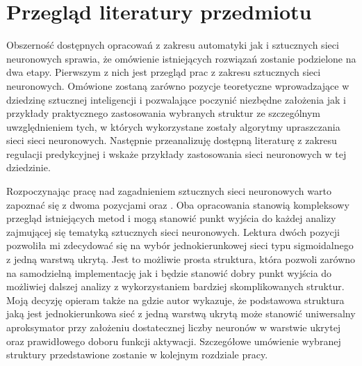 \newpage %
\section{Przegląd literatury przedmiotu}
Obszerność dostępnych opracowań z zakresu automatyki jak i sztucznych sieci neuronowych sprawia, że omówienie istniejących rozwiązań zostanie podzielone na dwa etapy. Pierwszym z nich jest przegląd prac z zakresu sztucznych sieci neuronowych. Omówione zostaną zarówno pozycje teoretyczne wprowadzające w dziedzinę sztucznej inteligencji i pozwalające poczynić niezbędne założenia jak i przykłady praktycznego zastosowania wybranych struktur ze szczególnym uwzględnieniem tych, w których wykorzystane zostały algorytmy upraszczania sieci sieci neuronowych. Następnie przeanalizuję dostępną literaturę z zakresu regulacji predykcyjnej i wskaże przykłady zastosowania sieci neuronowych w tej dziedzinie.

\par Rozpoczynając pracę nad zagadnieniem sztucznych sieci neuronowych warto zapoznać się z dwoma pozycjami \cite{haykin1999} oraz \cite{osowski2013}. Oba opracowania stanowią kompleksowy przegląd istniejących metod i mogą stanowić punkt wyjścia do każdej analizy zajmującej się tematyką sztucznych sieci neuronowych. Lektura dwóch pozycji pozwoliła mi zdecydować się na wybór jednokierunkowej sieci typu sigmoidalnego z jedną warstwą ukrytą. Jest to możliwie prosta struktura, która pozwoli zarówno na samodzielną implementację jak i będzie stanowić dobry punkt wyjścia do możliwiej dalszej analizy z wykorzystaniem bardziej skomplikowanych struktur. Moją decyzję opieram także na \cite{hornik1991} gdzie autor wykazuje, że podstawowa struktura jaką jest jednokierunkowa sieć z jedną warstwą ukrytą może stanowić uniwersalny aproksymator przy założeniu dostatecznej liczby neuronów w warstwie ukrytej oraz prawidłowego doboru funkcji aktywacji. Szczegółowe umówienie wybranej struktury przedstawione zostanie w kolejnym rozdziale pracy. 

